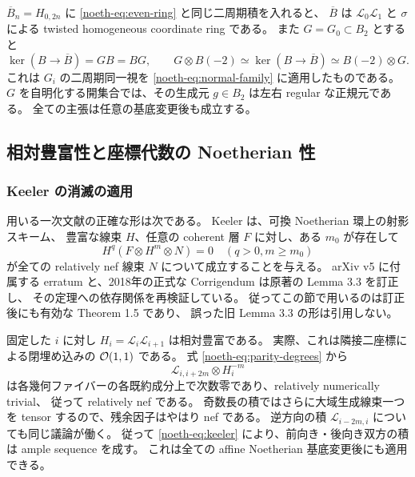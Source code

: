 $\overline B_n=H_{0,2n}$ に \eqref{noeth-eq:even-ring} と同じ二周期積を入れると、
$\overline B$ は $\mathcal L_0\mathcal L_1$ と $\sigma$ による twisted homogeneous coordinate ring である。
また $G=G_0\subset B_2$ とすると
\begin{equation}\label{noeth-eq:graded-normal-line}
 \ker(B\to\overline B)=GB=BG,
 \qquad G\otimes B(-2)\simeq\ker(B\to\overline B)\simeq B(-2)\otimes G.
\end{equation}
これは $G_i$ の二周期同一視を \eqref{noeth-eq:normal-family} に適用したものである。
$G$ を自明化する開集合では、その生成元 $g\in B_2$ は左右 regular な正規元である。
全ての主張は任意の基底変更後も成立する。

\subsection{相対豊富性と座標代数の Noetherian 性}

\subsubsection{Keeler の消滅の適用}

用いる一次文献の正確な形は次である。
Keeler \cite[Theorem 1.5]{Keeler2003} は、可換 Noetherian 環上の射影スキーム、
豊富な線束 $H$、任意の coherent 層 $F$ に対し、ある $m_0$ が存在して
\begin{equation}\label{noeth-eq:keeler}
 H^q(F\otimes H^m\otimes N)=0
 \quad(q>0, m\ge m_0)
\end{equation}
が全ての relatively nef 線束 $N$ について成立することを与える。
arXiv v5 に付属する erratum と、2018年の正式な
Corrigendum \cite{Keeler2018Corrigendum} は原著の Lemma 3.3 を訂正し、
その定理への依存関係を再検証している。
従ってこの節で用いるのは訂正後にも有効な
Theorem 1.5 \cite[付属 Erratum, \S2]{Keeler2003} であり、
誤った旧 Lemma 3.3 の形は引用しない。

固定した $i$ に対し $H_i=\mathcal L_i\mathcal L_{i+1}$ は相対豊富である。
実際、これは隣接二座標による閉埋め込みの $\mathcal O(1,1)$ である。
式 \eqref{noeth-eq:parity-degrees} から
\begin{equation}\label{noeth-eq:nef-prefix}
 \mathcal L_{i,i+2m}\otimes H_i^{-m}
\end{equation}
は各幾何ファイバーの各既約成分上で次数零であり、relatively numerically trivial、
従って relatively nef である。
奇数長の積ではさらに大域生成線束一つを tensor するので、残余因子はやはり nef である。
逆方向の積 $\mathcal L_{i-2m,i}$ についても同じ議論が働く。
従って \eqref{noeth-eq:keeler} により、前向き・後向き双方の積は ample sequence を成す。
これは全ての affine Noetherian 基底変更後にも適用できる。

